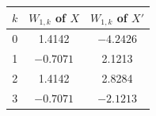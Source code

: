\begin{tabular}{ccc}
\toprule
$k$ & $W_{1,k}$ of $X$ & $W_{1,k}$ of $X'$ \\
\midrule
0 & 1.4142 & $-4.2426$ \\
1 & $-0.7071$ & 2.1213 \\
2 & 1.4142 & 2.8284 \\
3 & $-0.7071$ & $-2.1213$ \\
\bottomrule
\end{tabular}